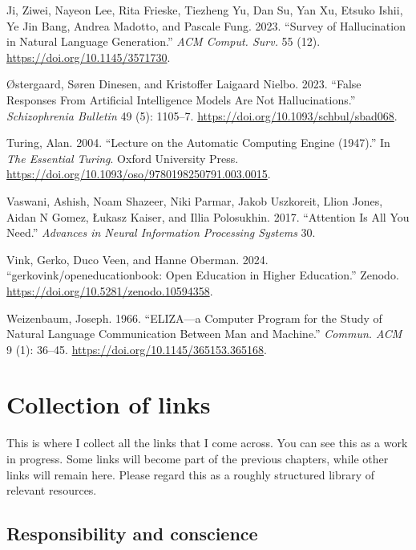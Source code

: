 \documentclass[
  letterpaper,
  DIV=11,
  numbers=noendperiod]{scrreprt}
\newlength{\cslhangindent}
\newenvironment{CSLReferences}[2] %
 {\begin{list}{}{%
  \setlength{\itemindent}{0pt}
  \setlength{\leftmargin}{0pt}
  \setlength{\parsep}{0pt}
  \ifodd #1
   \setlength{\leftmargin}{\cslhangindent}
   \setlength{\itemindent}{-1\cslhangindent}
  \fi
  \setlength{\itemsep}{#2\baselineskip}}}
 {\end{list}}
\begin{document}
\begin{CSLReferences}{1}{0}
Ji, Ziwei, Nayeon Lee, Rita Frieske, Tiezheng Yu, Dan Su, Yan Xu, Etsuko
Ishii, Ye Jin Bang, Andrea Madotto, and Pascale Fung. 2023. {``Survey of
Hallucination in Natural Language Generation.''} \emph{ACM Comput.
Surv.} 55 (12). \url{https://doi.org/10.1145/3571730}.

Østergaard, Søren Dinesen, and Kristoffer Laigaard Nielbo. 2023.
{``{False Responses From Artificial Intelligence Models Are Not
Hallucinations}.''} \emph{Schizophrenia Bulletin} 49 (5): 1105--7.
\url{https://doi.org/10.1093/schbul/sbad068}.

Turing, Alan. 2004. {``{Lecture on the Automatic Computing Engine
(1947)}.''} In \emph{{The Essential Turing}}. Oxford University Press.
\url{https://doi.org/10.1093/oso/9780198250791.003.0015}.

Vaswani, Ashish, Noam Shazeer, Niki Parmar, Jakob Uszkoreit, Llion
Jones, Aidan N Gomez, Łukasz Kaiser, and Illia Polosukhin. 2017.
{``Attention Is All You Need.''} \emph{Advances in Neural Information
Processing Systems} 30.

Vink, Gerko, Duco Veen, and Hanne Oberman. 2024.
{``{gerkovink/openeducationbook: Open Education in Higher Education}.''}
Zenodo. \url{https://doi.org/10.5281/zenodo.10594358}.

Weizenbaum, Joseph. 1966. {``ELIZA---a Computer Program for the Study of
Natural Language Communication Between Man and Machine.''} \emph{Commun.
ACM} 9 (1): 36--45. \url{https://doi.org/10.1145/365153.365168}.

\end{CSLReferences}


\chapter{Collection of links}\label{sec-links}

This is where I collect all the links that I come across. You can see
this as a work in progress. Some links will become part of the previous
chapters, while other links will remain here. Please regard this as a
roughly structured library of relevant resources.

\section{Responsibility and
conscience}\label{responsibility-and-conscience}
\end{document}

